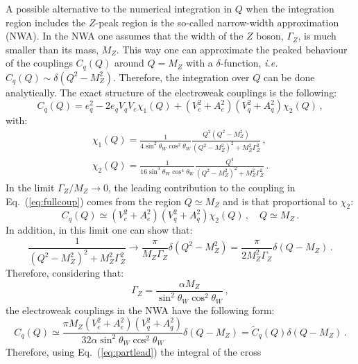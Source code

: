 \documentclass[10pt,a4paper]{article}
\begin{document}
A possible alternative to the numerical integration in $Q$ when the
integration region includes the $Z$-peak region is the so-called
narrow-width approximation (NWA). In the NWA one assumes that the
width of the $Z$ boson, $\Gamma_Z$, is much smaller than its mass,
$M_Z$. This way one can approximate the peaked behaviour of the
couplings $C_q(Q)$ around $Q=M_Z$ with a $\delta$-function,
\textit{i.e.}  $C_q(Q)\sim \delta(Q^2-M_Z^2)$. Therefore, the
integration over $Q$ can be done analytically. The exact structure of
the electroweak couplings is the following:
\begin{equation}\label{eq:fullcoup}
C_q(Q) = e_q^2 - 2 e_q V_q V_e \chi_1(Q) + (V_e^2 + A_e^2)(V_q^2 + A_q^2)\chi_2(Q)\,,
\end{equation}
with:
\begin{equation}
\begin{array}{l}
\displaystyle \chi_1(Q) = \frac{1}{4 \sin^2\theta_W \cos^2\theta_W } \frac{Q^2 ( Q^2 -  M_Z^2 )}{ (Q^2 - M_Z^2)^2 + M_Z^2 \Gamma_Z^2} \,,\\
\displaystyle \chi_2(Q) = \frac{1}{16 \sin^4\theta_W\cos^4\theta_W} \frac{Q^4}{ (Q^2 - M_Z^2)^2 + M_Z^2 \Gamma_Z^2} \,.
\end{array}
\end{equation}
In the limit $\Gamma_Z/M_Z\rightarrow 0$, the leading contribution to
the coupling in Eq.~(\ref{eq:fullcoup}) comes from the region
$Q\simeq M_Z$ and is that proportional to $\chi_2$:
\begin{equation}\label{eq:partlead}
C_q(Q) \simeq (V_e^2 + A_e^2)(V_q^2 + A_q^2)\chi_2(Q)\,,\quad Q\simeq M_Z\,.
\end{equation}
In addition, in this limit one can show that:
\begin{equation}\label{eq:breitwigner}
\frac{1}{ (Q^2 - M_Z^2)^2 + M_Z^2 \Gamma_Z^2}\rightarrow
\frac{\pi}{M_Z\Gamma_Z}\delta(Q^2-M_Z^2) = \frac{\pi}{2M_Z^2\Gamma_Z}\delta(Q-M_Z)\,.
\end{equation}
Therefore, considering that:
\begin{equation}
\Gamma_Z = \frac{\alpha M_Z}{\sin^2\theta_W \cos^2\theta_W}\,,
\end{equation}
the electroweak couplings in the NWA have the following form:
\begin{equation}\label{eq:partlead}
  C_q(Q) \simeq \frac{\pi M_Z (V_e^2 + A_e^2)(V_q^2 + A_q^2) }{32 \alpha
    \sin^2\theta_W\cos^2\theta_W} \delta(Q-M_Z)=\widetilde{C}_q(Q) \delta(Q-M_Z)\,.
\end{equation}
Therefore, using Eq.~(\ref{eq:partlead}) the integral of the cross
\end{document}
